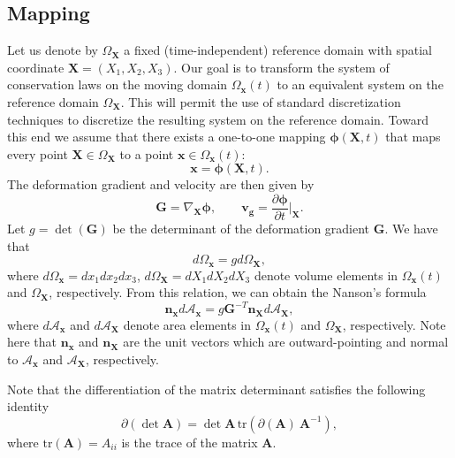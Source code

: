 \documentclass[11pt]{article}
\begin{document}
\subsection{Mapping}

Let us denote by $\Omega_{\bm{X}}$ a fixed (time-independent) reference domain with spatial coordinate $\bm{X} = (X_1,X_2,X_3)$. Our goal is to transform the system of conservation laws on the moving domain $\Omega_{\bm{x}}(t)$ to an equivalent system on the reference domain $\Omega_{\bm{X}}$. This will permit the use of standard discretization techniques to discretize the resulting system on the reference domain. Toward this end we assume that there exists a one-to-one mapping $\bm{\phi}(\bm{X},t)$ that maps every point $\bm{X} \in \Omega_{\bm{X}}$ to a point $\bm{x} \in \Omega_{\bm{x}}(t)$:
\begin{equation}
\bm{x}  =  \bm{\phi}(\bm{X},t) .
\end{equation}
The deformation gradient and velocity are then given by
\begin{equation}
\bm{G} = \nabla_{\bm{X}} \bm{\phi}, \qquad \bm{v}_{\bm{g}}  =  \frac{\partial \bm{\phi}}{\partial t} \Big|_{\bm{X}} .
\end{equation}
Let $g = \det(\bm{G})$ be the determinant of the deformation gradient $\bm{G}$. We have that 
\begin{equation}
d\Omega_{\bm{x}} = g d \Omega_{\bm{X}},
\end{equation}
where $d\Omega_{\bm{x}} = d x_1 dx_2 dx_3$, $d\Omega_{\bm{X}} = d X_1 dX_2 dX_3$ denote volume elements in $\Omega_{\bm{x}}(t)$ and $\Omega_{\bm{X}}$, respectively. From this relation, we can obtain the Nanson's formula 
\begin{equation}
\label{area}
\bm{n}_{\bm{x}} d \mathcal{A}_{\bm{x}} = g \bm{G}^{-T} \bm{n}_{\bm{X}} d \mathcal{A}_{\bm{X}},
\end{equation}
where $d \mathcal{A}_{\bm{x}}$ and $d \mathcal{A}_{\bm{X}}$ denote area elements in $\Omega_{\bm{x}}(t)$ and $\Omega_{\bm{X}}$, respectively. Note here that $\bm{n}_{\bm{x}}$ and $\bm{n}_{\bm{X}}$ are the unit vectors which are outward-pointing and normal to  $\mathcal{A}_{\bm{x}}$ and $\mathcal{A}_{\bm{X}}$, respectively.

Note that the differentiation of the matrix determinant satisfies the following identity
\begin{equation}
\partial (\det \bm{A}) = \det \bm{A} \,  \mathrm{tr} (\partial (\bm{A}) \ \bm{A}^{-1}) ,
\end{equation}
where $\mathrm{tr}(\bm{A}) = A_{ii}$ is the trace of the matrix $\bm{A}$. 
\end{document}
